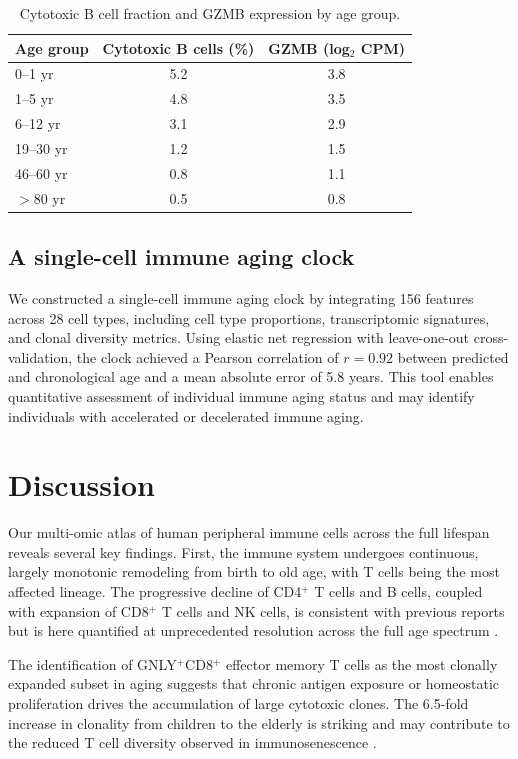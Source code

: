 \documentclass[11pt]{article}
\begin{document}
\begin{table}[h]
\centering
\caption{Cytotoxic B cell fraction and GZMB expression by age group.}
\label{tab:cytob}
\begin{tabular}{lcc}
\toprule
Age group & Cytotoxic B cells (\%) & GZMB (log$_2$ CPM) \\
\midrule
0--1 yr & 5.2 & 3.8 \\
1--5 yr & 4.8 & 3.5 \\
6--12 yr & 3.1 & 2.9 \\
19--30 yr & 1.2 & 1.5 \\
46--60 yr & 0.8 & 1.1 \\
$>$80 yr & 0.5 & 0.8 \\
\bottomrule
\end{tabular}
\end{table}

\subsection{A single-cell immune aging clock}
We constructed a single-cell immune aging clock by integrating 156 features across 28 cell types, including cell type proportions, transcriptomic signatures, and clonal diversity metrics. Using elastic net regression with leave-one-out cross-validation, the clock achieved a Pearson correlation of $r = 0.92$ between predicted and chronological age and a mean absolute error of 5.8 years. This tool enables quantitative assessment of individual immune aging status and may identify individuals with accelerated or decelerated immune aging.

\section{Discussion}

Our multi-omic atlas of human peripheral immune cells across the full lifespan reveals several key findings. First, the immune system undergoes continuous, largely monotonic remodeling from birth to old age, with T cells being the most affected lineage. The progressive decline of CD4$^+$ T cells and B cells, coupled with expansion of CD8$^+$ T cells and NK cells, is consistent with previous reports but is here quantified at unprecedented resolution across the full age spectrum \citep{nikolich2018immune, goronzy2013understanding}.

The identification of GNLY$^+$CD8$^+$ effector memory T cells as the most clonally expanded subset in aging suggests that chronic antigen exposure or homeostatic proliferation drives the accumulation of large cytotoxic clones. The 6.5-fold increase in clonality from children to the elderly is striking and may contribute to the reduced T cell diversity observed in immunosenescence \citep{britanova2014age}.
\end{document}
